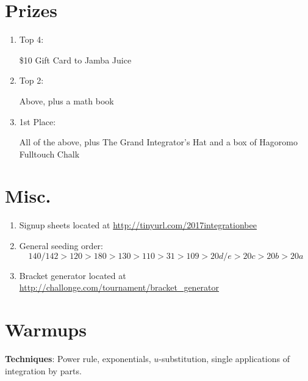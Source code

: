 \documentclass{article}
\begin{document}
\section{Prizes}

\begin{enumerate}
    \item Top 4:

    \$10 Gift Card to Jamba Juice

    \item Top 2:

    Above, plus a math book

    \item 1st Place:

    All of the above, plus The Grand Integrator's Hat and a box of Hagoromo Fulltouch Chalk
\end{enumerate}

\section{Misc.}
\begin{enumerate}

    \item Signup sheets located at \url{http://tinyurl.com/2017integrationbee}

    \item
    General seeding order:
    \[
    140/142 > 120 > 180 > 130 > 110 > 31 > 109 > 20d/e > 20c > 20b > 20a
    \]

    \item
    Bracket generator located at \url{http://challonge.com/tournament/bracket_generator}

\end{enumerate}




\section{Warmups}

\textbf{Techniques}: Power rule, exponentials, $u$-substitution, single applications of integration by parts.
\end{document}

